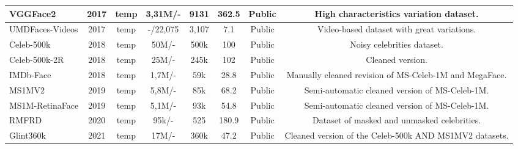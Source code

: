 \documentclass[class=report, crop=false, a4paper, 12pt]{standalone}
\begin{document}
\begin{table}[!ht]
{\begin{tabular}{|l|c|c|c|c|c|c|c|}
    VGGFace2 \autocite{caoVGGFace2DatasetRecognising2018}                               & 2017          & temp                  & 3,31M/-                & 9131           & 362.5                 & Public                & High characteristics variation dataset.                 \\ \hline
    UMDFaces-Videos \autocite{bansalDonTsCNNbased2017}                        & 2017          & temp                  & -/22,075               & 3,107          & 7.1                   & Public                & Video-based dataset with great variations.                 \\ \hline
    Celeb-500k \autocite{caoCeleb500KLargeTraining2018}                             & 2018          & temp                  & 50M/-                  & 500k           & 100                   & Public                & Noisy celebrities dataset.                 \\ \hline
    Celeb-500k-2R \autocite{caoCeleb500KLargeTraining2018}                          & 2018          & temp                  & 25M/-                  & 245k           & 102                   & Public                & Cleaned version.                 \\ \hline
    IMDb-Face \autocite{wangDevilFaceRecognition2018}                              & 2018          & temp                  & 1,7M/-                 & 59k            & 28.8                  & Public                & Manually cleaned revision of MS-Celeb-1M and MegaFace.                 \\ \hline
    MS1MV2 \autocite{dengArcFaceAdditiveAngular}                                 & 2019          & temp                  & 5,8M/-                 & 85k            & 68.2                  & Public                & Semi-automatic cleaned version of MS-Celeb-1M.                 \\ \hline
    MS1M-RetinaFace \autocite{dengLightweightFaceRecognition2019}                                 & 2019          & temp                  & 5,1M/-                 & 93k            & 54.8                  & Public                & Semi-automatic cleaned version of MS-Celeb-1M.                 \\ \hline
    RMFRD \autocite{wangMaskedFaceRecognition2020}                                 & 2020          & temp                  & 95k/-                  & 525            & 180.9                 & Public                & Dataset of masked and unmasked celebrities.                 \\ \hline
    Glint360k \autocite{anPartialFCTraining2021}                              & 2021          & temp                  & 17M/-                  & 360k           & 47.2                  & Public                & Cleaned version of the Celeb-500k AND MS1MV2 datasets.                \\ \hline

\end{tabular}}
\end{table}
\end{document}
